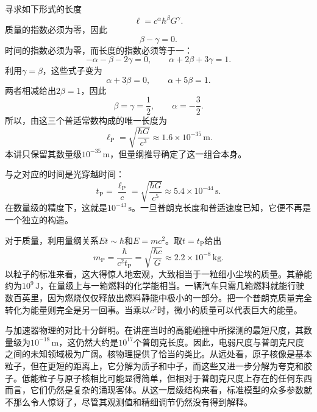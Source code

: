 寻求如下形式的长度
\begin{equation}
\ell=c^\alpha\hbar^\beta G^\gamma.
\label{eq:c10-length-ansatz}
\end{equation}
质量的指数必须为零，因此
\[
\beta-\gamma=0.
\]
时间的指数必须为零，而长度的指数必须等于一：
\[
-\alpha-\beta-2\gamma=0,
\qquad
\alpha+2\beta+3\gamma=1.
\]
利用\(\gamma=\beta\)，这些式子变为
\[
\alpha+3\beta=0,
\qquad
\alpha+5\beta=1.
\]
两者相减给出\(2\beta=1\)，因此
\[
\beta=\gamma=\frac12,
\qquad
\alpha=-\frac32.
\]
所以，由这三个普适常数构成的唯一长度为
\begin{equation}
\ell_{\mathrm P}
=\sqrt{\frac{\hbar G}{c^3}}
\approx 1.6\times10^{-35}\,\mathrm m.
\label{eq:c10-planck-length}
\end{equation}
本讲只保留其数量级\(10^{-35}\,\mathrm m\)，但量纲推导确定了这一组合本身。

与之对应的时间是光穿越时间：
\begin{equation}
t_{\mathrm P}
=\frac{\ell_{\mathrm P}}{c}
=\sqrt{\frac{\hbar G}{c^5}}
\approx 5.4\times10^{-44}\,\mathrm s.
\label{eq:c10-planck-time}
\end{equation}
在数量级的精度下，这就是\(10^{-43}\,\mathrm s\)。一旦普朗克长度和普适速度已知，它便不再是一个独立的构造。

对于质量，利用量纲关系\(Et\sim\hbar\)和\(E=mc^2\)。取\(t=t_{\mathrm P}\)给出
\begin{equation}
m_{\mathrm P}
=\frac{\hbar}{c^2t_{\mathrm P}}
=\sqrt{\frac{\hbar c}{G}}
\approx 2.2\times10^{-8}\,\mathrm{kg}.
\label{eq:c10-planck-mass}
\end{equation}
以粒子的标准来看，这大得惊人地宏观，大致相当于一粒细小尘埃的质量。其静能约为\(10^9\,\mathrm J\)，在量级上与一箱燃料的化学能相当。一辆汽车只需几箱燃料就能行驶数百英里，因为燃烧仅仅释放出燃料静能中极小的一部分。把一个普朗克质量完全转化为能量则完全是另一回事。当乘以\(c^2\)时，微小的质量可以代表巨大的能量。

与加速器物理的对比十分鲜明。在讲座当时的高能碰撞中所探测的最短尺度，其数量级为\(10^{-18}\,\mathrm m\)，这仍然大约是\(10^{17}\)个普朗克长度。因此，电弱尺度与普朗克尺度之间的未知领域极为广阔。核物理提供了恰当的类比。从远处看，原子核像是基本粒子，但在更短的距离上，它分解为质子和中子，而这些又进一步分解为夸克和胶子。低能粒子与原子核相比可能显得简单，但相对于普朗克尺度上存在的任何东西而言，它们仍然是复杂的涌现客体。从这一层级结构来看，标准模型的众多参数就不那么令人惊讶了，尽管其观测值和精细调节仍然没有得到解释。

\begin{classroomqa}
\end{classroomqa}

